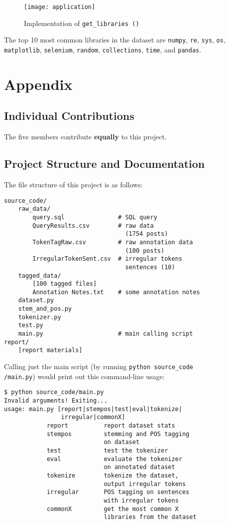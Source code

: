 \begin{figure}[htp]
\texttt{[image: application]}
\caption{Implementation of \texttt{get\_libraries\,()}}\label{img:app}
\end{figure}

The top 10 most common libraries in the dataset are \texttt{numpy}, \texttt{re},
\texttt{sys}, \texttt{os}, \texttt{matplotlib}, \texttt{selenium}, \texttt{random},
\texttt{collections}, \texttt{time}, and \texttt{pandas}.

\section*{Appendix}

\subsection*{Individual Contributions}

The five members contribute \textbf{equally} to this project.

\subsection*{Project Structure and Documentation}

The file structure of this project is as follows:

\begin{lstlisting}
source_code/
    raw_data/
        query.sql               # SQL query
        QueryResults.csv        # raw data
                                  (1754 posts)
        TokenTagRaw.csv         # raw annotation data
                                  (100 posts)
        IrregularTokenSent.csv  # irregular tokens
                                  sentences (10)
    tagged_data/
        [100 tagged files]
        Annotation Notes.txt    # some annotation notes
    dataset.py
    stem_and_pos.py
    tokenizer.py
    test.py
    main.py                     # main calling script
report/
    [report materials]
\end{lstlisting}

Calling just the main script (by running \texttt{python source\_code\\/main.py})
would print out this command-line usage:

\begin{lstlisting}
$ python source_code/main.py
Invalid arguments! Exiting...
usage: main.py [report|stempos|test|eval|tokenize|
                irregular|commonX]
            report          report dataset stats
            stempos         stemming and POS tagging
                            on dataset
            test            test the tokenizer
            eval            evaluate the tokenizer
                            on annotated dataset
            tokenize        tokenize the dataset,
                            output irregular tokens
            irregular       POS tagging on sentences
                            with irregular tokens
            commonX         get the most common X
                            libraries from the dataset
\end{lstlisting}

